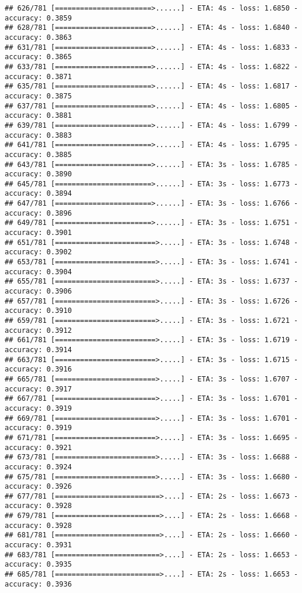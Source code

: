 \documentclass[
]{article}
\begin{document}
\begin{verbatim}
## 626/781 [=======================>......] - ETA: 4s - loss: 1.6850 - accuracy: 0.3859
## 628/781 [=======================>......] - ETA: 4s - loss: 1.6840 - accuracy: 0.3863
## 631/781 [=======================>......] - ETA: 4s - loss: 1.6833 - accuracy: 0.3865
## 633/781 [=======================>......] - ETA: 4s - loss: 1.6822 - accuracy: 0.3871
## 635/781 [=======================>......] - ETA: 4s - loss: 1.6817 - accuracy: 0.3875
## 637/781 [=======================>......] - ETA: 4s - loss: 1.6805 - accuracy: 0.3881
## 639/781 [=======================>......] - ETA: 4s - loss: 1.6799 - accuracy: 0.3883
## 641/781 [=======================>......] - ETA: 4s - loss: 1.6795 - accuracy: 0.3885
## 643/781 [=======================>......] - ETA: 3s - loss: 1.6785 - accuracy: 0.3890
## 645/781 [=======================>......] - ETA: 3s - loss: 1.6773 - accuracy: 0.3894
## 647/781 [=======================>......] - ETA: 3s - loss: 1.6766 - accuracy: 0.3896
## 649/781 [=======================>......] - ETA: 3s - loss: 1.6751 - accuracy: 0.3901
## 651/781 [========================>.....] - ETA: 3s - loss: 1.6748 - accuracy: 0.3902
## 653/781 [========================>.....] - ETA: 3s - loss: 1.6741 - accuracy: 0.3904
## 655/781 [========================>.....] - ETA: 3s - loss: 1.6737 - accuracy: 0.3906
## 657/781 [========================>.....] - ETA: 3s - loss: 1.6726 - accuracy: 0.3910
## 659/781 [========================>.....] - ETA: 3s - loss: 1.6721 - accuracy: 0.3912
## 661/781 [========================>.....] - ETA: 3s - loss: 1.6719 - accuracy: 0.3914
## 663/781 [========================>.....] - ETA: 3s - loss: 1.6715 - accuracy: 0.3916
## 665/781 [========================>.....] - ETA: 3s - loss: 1.6707 - accuracy: 0.3917
## 667/781 [========================>.....] - ETA: 3s - loss: 1.6701 - accuracy: 0.3919
## 669/781 [========================>.....] - ETA: 3s - loss: 1.6701 - accuracy: 0.3919
## 671/781 [========================>.....] - ETA: 3s - loss: 1.6695 - accuracy: 0.3921
## 673/781 [========================>.....] - ETA: 3s - loss: 1.6688 - accuracy: 0.3924
## 675/781 [========================>.....] - ETA: 3s - loss: 1.6680 - accuracy: 0.3926
## 677/781 [=========================>....] - ETA: 2s - loss: 1.6673 - accuracy: 0.3928
## 679/781 [=========================>....] - ETA: 2s - loss: 1.6668 - accuracy: 0.3928
## 681/781 [=========================>....] - ETA: 2s - loss: 1.6660 - accuracy: 0.3931
## 683/781 [=========================>....] - ETA: 2s - loss: 1.6653 - accuracy: 0.3935
## 685/781 [=========================>....] - ETA: 2s - loss: 1.6653 - accuracy: 0.3936

\end{verbatim}
\end{document}
